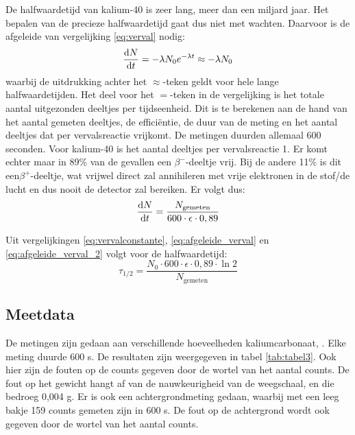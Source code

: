 \documentclass[11pt,a4paper]{article}
\begin{document}
De halfwaardetijd van kalium-40 is zeer lang, meer dan een miljard jaar. Het bepalen van de precieze halfwaardetijd gaat dus niet met wachten. Daarvoor is de afgeleide van vergelijking \ref{eq:verval} nodig:
\begin{equation}
\dv{N}{t} = -\lambda N_0 e^{-\lambda t} \approx -\lambda N_0
\label{eq:afgeleide_verval}
\end{equation}
waarbij de uitdrukking achter het $\approx$-teken geldt voor hele lange halfwaardetijden. Het deel voor het $=$-teken in de vergelijking is het totale aantal uitgezonden deeltjes per tijdseenheid. Dit is te berekenen aan de hand van het aantal gemeten deeltjes, de efficiëntie, de duur van de meting en het aantal deeltjes dat per vervalsreactie vrijkomt. De metingen duurden allemaal 600 seconden. Voor kalium-40 is het aantal deeltjes per vervalsreactie 1. Er komt echter maar in 89\% van de gevallen een $\beta^-$-deeltje vrij. Bij de andere 11\% is dit een$\beta^+$-deeltje, wat vrijwel direct zal annihileren met vrije elektronen in de stof/de lucht en dus nooit de detector zal bereiken. Er volgt dus:
\begin{equation}
\dv{N}{t} = \frac{N_\mathrm{gemeten}}{600\cdot\epsilon\cdot 0,89}
\label{eq:afgeleide_verval_2}
\end{equation}

Uit vergelijkingen \ref{eq:vervalconstante}, \ref{eq:afgeleide_verval} en \ref{eq:afgeleide_verval_2} volgt voor de halfwaardetijd:
\begin{equation}
\tau_{1/2} = \frac{N_0 \cdot 600 \cdot \epsilon \cdot 0,89 \cdot \ln 2}{N_\mathrm{gemeten}}
\label{eq:halfwaardetijd}
\end{equation}

\subsection{Meetdata}
De metingen zijn gedaan aan verschillende hoeveelheden kaliumcarbonaat, . Elke meting duurde 600 s. De resultaten zijn weergegeven in tabel \ref{tab:tabel3}. Ook hier zijn de fouten op de counts gegeven door de wortel van het aantal counts. De fout op het gewicht hangt af van de nauwkeurigheid van de weegschaal, en die bedroeg 0,004 g. Er is ook een achtergrondmeting gedaan, waarbij met een leeg bakje 159 counts gemeten zijn in 600 s. De fout op de achtergrond wordt ook gegeven door de wortel van het aantal counts.
\end{document}
